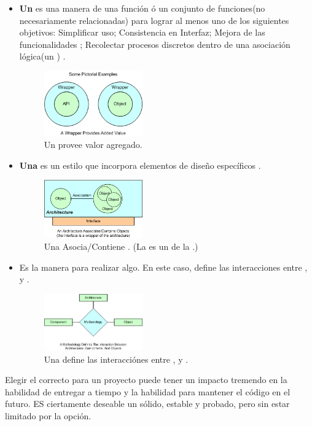 \begin{itemize}
	\item \textbf{Un \wrapperAS} es una manera de \repackagingAS una función ó un conjunto de funciones(no necesariamente relacionadas) para lograr al menos uno de los siguientes objetivos: Simplificar uso; Consistencia en Interfaz; Mejora de las funcionalidades \coreAS; Recolectar procesos discretos dentro de una asociación lógica(un \objectPL) \cite{online_codeProject_what_is_framework}.

		\begin{figure}[h!]
			\centering
			\includegraphics[width=0.4\textwidth]{figuras/framework_component_wrapper.jpg}
			\caption{Un \wrapperAS provee valor agregado.}
			\label{figure:framework_component_wrapper}
		\end{figure}

	\item \textbf{Una \architectureCPT} es un estilo que incorpora elementos de diseño específicos \cite{online_codeProject_what_is_framework}.

		\begin{figure}[h!]
			\centering
			\includegraphics[width=0.4\textwidth]{figuras/framework_component_architecture.jpg}
			\caption{Una \architectureCPT Asocia/Contiene \objectsPL. (La \interfaceAS es un \wrapperAS de la \architectureCPT.)}
			\label{figure:framework_component_architecture}
		\end{figure}

	\item \textbf{\methodologyCPT} Es la manera para realizar algo. En este caso, define las interacciones entre \architectureCPT, \componentsAS y \objectsPL \cite{online_codeProject_what_is_framework}.

		\begin{figure}[h!]
			\centering
			\includegraphics[width=0.4\textwidth]{figuras/framework_component_methodology.jpg}
			\caption{Una \methodologyCPT define las interacciónes entre \architectureCPT, \componentsAS y \objectsPL.}
			\label{figure:framework_component_methodology}
		\end{figure}

\end{itemize}

Elegir el \frameworkPC correcto para un proyecto puede tener un impacto tremendo en la habilidad de entregar a tiempo y la habilidad para mantener el código en el futuro. ES ciertamente deseable un \frameworkPC sólido, estable y probado, pero sin estar limitado por la opción.